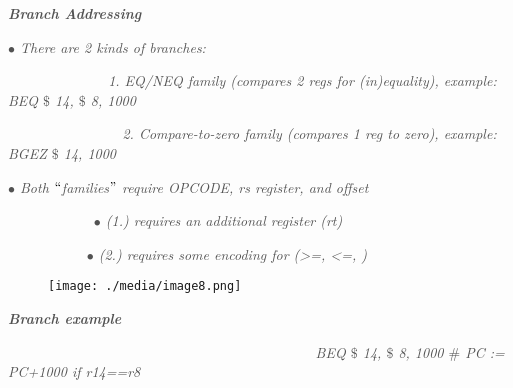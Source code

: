 \documentclass[12pt]{article}
\begin{document}
{\fontsize{14pt}{16.8pt}\selectfont \textbf{\textit{\textcolor[HTML]{525252}{Branch Addressing}}}\par}\par

\textit{\textcolor[HTML]{525252}{$\bullet$  There are 2 kinds of branches: }}\par

\textit{\textcolor[HTML]{525252}{\ \  \tab \  \ \ \ \ \ \ \ \ \ \ \  1. EQ/NEQ family (compares 2 regs for (in)equality), example: BEQ $\$$ 14, $\$$ 8, 1000}}\par

\textit{\textcolor[HTML]{525252}{\ \ \ \  \tab \ \ \ \ \ \ \ \ \ \ \ \  2. Compare-to-zero family (compares 1 reg to zero), example: BGEZ $\$$ 14, 1000 }}\par

\textit{\textcolor[HTML]{525252}{$\bullet$  Both $``$families$"$  require OPCODE, rs register, and offset}}\par

\textit{\textcolor[HTML]{525252}{\ \ \  \tab \ \ \ \ \ \ \ \ \  $\bullet$  (1.) requires an additional register (rt) }}\par

\textit{\textcolor[HTML]{525252}{\ \ \  \tab \ \ \ \ \ \ \ \  $\bullet$  (2.) requires some encoding for (>=, <=, )}}\par




\begin{figure}[H]
	\begin{Center}
		\texttt{[image: ./media/image8.png]}
	\end{Center}
\end{figure}



\par

{\fontsize{14pt}{16.8pt}\selectfont \textbf{\textit{\textcolor[HTML]{525252}{Branch example }}}\par}\par

\textit{\textcolor[HTML]{525252}{\ \ \ \ \ \ \ \ \ \  \tab \ \ \ \ \ \ \ \ \ \ \ \ \ \ \ \ \ \ \ \ \ \ \ \ \ \ \ \ \ \ \ \ \  BEQ $\$$ 14, $\$$ 8, 1000 $\#$  PC := PC+1000 if r14==r8 }}\par
\end{document}
